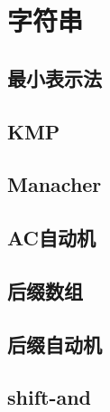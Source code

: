 \documentclass[main.tex]{subfiles}
\begin{document}
\chapter{字符串}
\section{最小表示法}
    
\section{KMP}
    
\section{Manacher}
    
\section{AC自动机}
    
\section{后缀数组}
    
\section{后缀自动机}
    
\section{shift-and}
    
\end{document}
